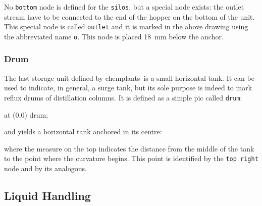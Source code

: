\documentclass[12pt]{article}						%
\newcommand*{\chpn}[1]{\texttt{#1}}				%
\newcommand*{\chpp}[1]{\texttt{#1}}				%
\newcommand*{\chemplants}{chemplants}
\begin{document}
No \chpn{bottom} node is defined for the \chpp{silos}, but a special node exists:
the outlet stream have to be connected to the end of the hopper on the bottom
of the unit. This special node is called \chpn{outlet} and it is marked in the
above drawing using the abbreviated name \chpn{o}. This node is placed
\SI{18}{\mm} below the anchor.

\subsubsection{Drum}

The last storage unit defined by \chemplants\ is a small horizontal tank. It can
be used to indicate, in general, a surge tank, but its sole purpose is indeed to
mark reflux drums of distillation columns. It is defined as a simple pic called
\chpp{drum}:
\begin{chpcode}
	\pic at (0,0) {drum};
\end{chpcode}
and yields a horizontal tank anchored in its centre:
\begin{center}
\end{center}
where the measure on the top indicates the distance from the middle of the tank
to the point where the curvature begins. This point is identified by the
\chpn{top right} node and by its analogous.

\subsection{Liquid Handling}
\end{document}
